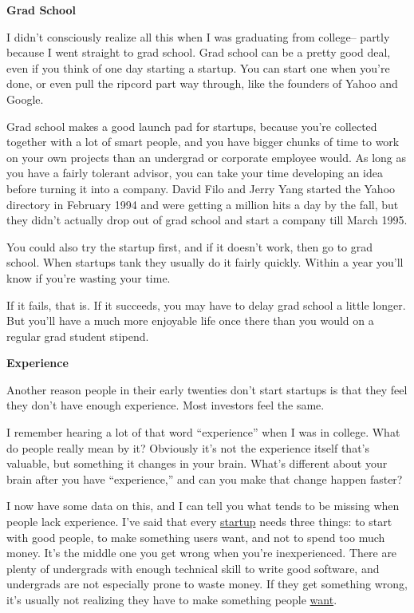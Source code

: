 \textbf{Grad School}

I didn't consciously realize all this when I was graduating from
college-- partly because I went straight to grad school. Grad school can
be a pretty good deal, even if you think of one day starting a startup.
You can start one when you're done, or even pull the ripcord part way
through, like the founders of Yahoo and Google.

Grad school makes a good launch pad for startups, because you're
collected together with a lot of smart people, and you have bigger
chunks of time to work on your own projects than an undergrad or
corporate employee would. As long as you have a fairly tolerant advisor,
you can take your time developing an idea before turning it into a
company. David Filo and Jerry Yang started the Yahoo directory in
February 1994 and were getting a million hits a day by the fall, but
they didn't actually drop out of grad school and start a company till
March 1995.

You could also try the startup first, and if it doesn't work, then go to
grad school. When startups tank they usually do it fairly quickly.
Within a year you'll know if you're wasting your time.

If it fails, that is. If it succeeds, you may have to delay grad school
a little longer. But you'll have a much more enjoyable life once there
than you would on a regular grad student stipend.

\textbf{Experience}

Another reason people in their early twenties don't start startups is
that they feel they don't have enough experience. Most investors feel
the same.

I remember hearing a lot of that word ``experience'' when I was in
college. What do people really mean by it? Obviously it's not the
experience itself that's valuable, but something it changes in your
brain. What's different about your brain after you have ``experience,''
and can you make that change happen faster?

I now have some data on this, and I can tell you what tends to be
missing when people lack experience. I've said that every
\href{start.html}{startup} needs three things: to start with good
people, to make something users want, and not to spend too much money.
It's the middle one you get wrong when you're inexperienced. There are
plenty of undergrads with enough technical skill to write good software,
and undergrads are not especially prone to waste money. If they get
something wrong, it's usually not realizing they have to make something
people \href{bronze.html}{want}.

